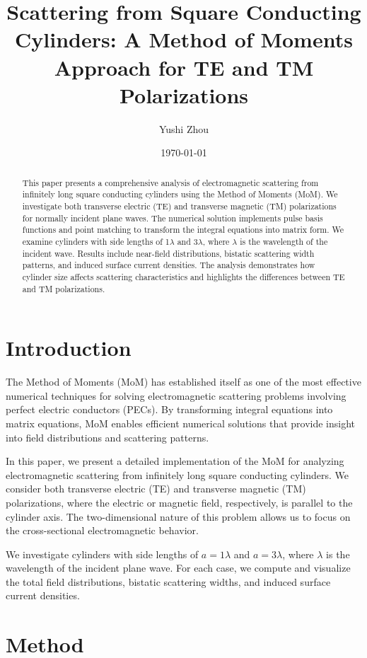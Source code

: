 \documentclass[10pt,a4paper]{article}
\title{Scattering from Square Conducting Cylinders: A Method of Moments Approach for TE and TM Polarizations}
\author[1]{Yushi Zhou}
\affil[1]{Department of Electrical and Computer Engineering}
\date{\today}
\begin{document}
\maketitle

\begin{abstract}
This paper presents a comprehensive analysis of electromagnetic scattering from infinitely long square conducting cylinders using the Method of Moments (MoM). We investigate both transverse electric (TE) and transverse magnetic (TM) polarizations for normally incident plane waves. The numerical solution implements pulse basis functions and point matching to transform the integral equations into matrix form. We examine cylinders with side lengths of 1$\lambda$ and 3$\lambda$, where $\lambda$ is the wavelength of the incident wave. Results include near-field distributions, bistatic scattering width patterns, and induced surface current densities. The analysis demonstrates how cylinder size affects scattering characteristics and highlights the differences between TE and TM polarizations. 
\end{abstract}

\section{Introduction}
The Method of Moments (MoM) has established itself as one of the most effective numerical techniques for solving electromagnetic scattering problems involving perfect electric conductors (PECs). By transforming integral equations into matrix equations, MoM enables efficient numerical solutions that provide insight into field distributions and scattering patterns.

In this paper, we present a detailed implementation of the MoM for analyzing electromagnetic scattering from infinitely long square conducting cylinders. We consider both transverse electric (TE) and transverse magnetic (TM) polarizations, where the electric or magnetic field, respectively, is parallel to the cylinder axis. The two-dimensional nature of this problem allows us to focus on the cross-sectional electromagnetic behavior.

We investigate cylinders with side lengths of $a = 1\lambda$ and $a = 3\lambda$, where $\lambda$ is the wavelength of the incident plane wave. For each case, we compute and visualize the total field distributions, bistatic scattering widths, and induced surface current densities.

\section{Method}
\end{document}
